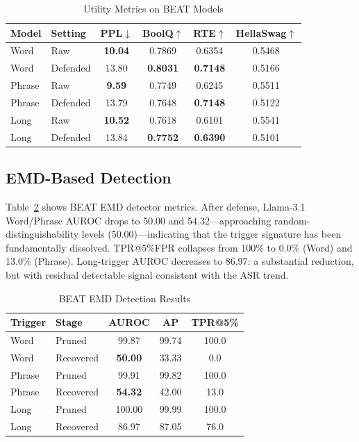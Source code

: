 \documentclass[lettersize,journal]{IEEEtran}
\begin{document}
\begin{table}[!t]
\caption{Utility Metrics on BEAT Models}
\label{tab:utility}
\centering
\begin{tabular}{llcccc}
\toprule
Model & Setting & PPL$\downarrow$ & BoolQ$\uparrow$ & RTE$\uparrow$ & HellaSwag$\uparrow$ \\
\midrule
Word & Raw & \textbf{10.04} & 0.7869 & 0.6354 & 0.5468 \\
Word & Defended & 13.80 & \textbf{0.8031} & \textbf{0.7148} & 0.5166 \\
Phrase & Raw & \textbf{9.59} & 0.7749 & 0.6245 & 0.5511 \\
Phrase & Defended & 13.79 & 0.7648 & \textbf{0.7148} & 0.5122 \\
Long & Raw & \textbf{10.52} & 0.7618 & 0.6101 & 0.5541 \\
Long & Defended & 13.84 & \textbf{0.7752} & \textbf{0.6390} & 0.5101 \\
\bottomrule
\end{tabular}
\end{table}

\subsection{EMD-Based Detection}
Table~\ref{tab:emd} shows BEAT EMD detector metrics. After defense, Llama-3.1 Word/Phrase AUROC drops to 50.00 and 54.32---approaching random-distinguishability levels (50.00)---indicating that the trigger signature has been fundamentally dissolved. TPR@5\%FPR collapses from 100\% to 0.0\% (Word) and 13.0\% (Phrase). Long-trigger AUROC decreases to 86.97: a substantial reduction, but with residual detectable signal consistent with the ASR trend.

\begin{table}[!t]
\caption{BEAT EMD Detection Results}
\label{tab:emd}
\centering
\begin{tabular}{llccc}
\toprule
Trigger & Stage & AUROC & AP & TPR@5\% \\
\midrule
Word & Pruned & 99.87 & 99.74 & 100.0 \\
Word & Recovered & \textbf{50.00} & 33.33 & 0.0 \\
Phrase & Pruned & 99.91 & 99.82 & 100.0 \\
Phrase & Recovered & \textbf{54.32} & 42.00 & 13.0 \\
Long & Pruned & 100.00 & 99.99 & 100.0 \\
Long & Recovered & 86.97 & 87.05 & 76.0 \\
\bottomrule
\end{tabular}
\end{table}
\end{document}
